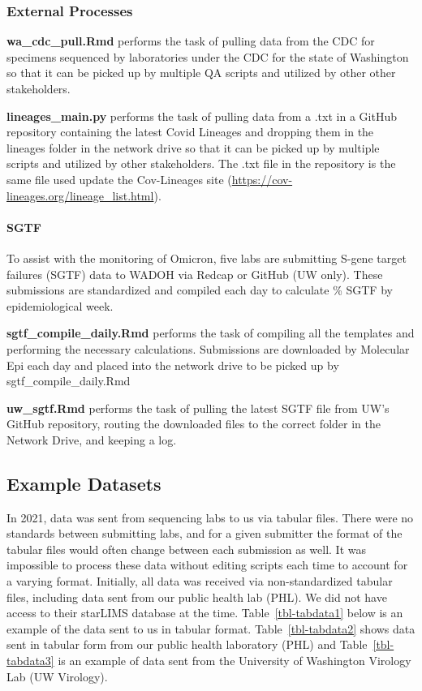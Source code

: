 \documentclass[
  letterpaper,
  DIV=11,
  numbers=noendperiod]{scrartcl}
\let\oldparagraph\paragraph
\renewcommand{\paragraph}[1]{\oldparagraph{#1}\mbox{}}
\begin{document}
\subsubsection{External Processes}\label{external-processes}

\textbf{wa\_cdc\_pull.Rmd} performs the task of pulling data from the
CDC for specimens sequenced by laboratories under the CDC for the state
of Washington so that it can be picked up by multiple QA scripts and
utilized by other other stakeholders.

\textbf{lineages\_main.py} performs the task of pulling data from a .txt
in a GitHub repository containing the latest Covid Lineages and dropping
them in the lineages folder in the network drive so that it can be
picked up by multiple scripts and utilized by other stakeholders. The
.txt file in the repository is the same file used update the
Cov-Lineages site (\url{https://cov-lineages.org/lineage_list.html}).

\paragraph{SGTF}\label{sgtf}

To assist with the monitoring of Omicron, five labs are submitting
S-gene target failures (SGTF) data to WADOH via Redcap or GitHub (UW
only). These submissions are standardized and compiled each day to
calculate \% SGTF by epidemiological week.

\textbf{sgtf\_compile\_daily.Rmd} performs the task of compiling all the
templates and performing the necessary calculations. Submissions are
downloaded by Molecular Epi each day and placed into the network drive
to be picked up by sgtf\_compile\_daily.Rmd

\textbf{uw\_sgtf.Rmd} performs the task of pulling the latest SGTF file
from UW's GitHub repository, routing the downloaded files to the correct
folder in the Network Drive, and keeping a log.

\subsection{Example Datasets}\label{example-datasets}

In 2021, data was sent from sequencing labs to us via tabular files.
There were no standards between submitting labs, and for a given
submitter the format of the tabular files would often change between
each submission as well\hspace{0pt}. It was impossible to process these
data without editing scripts each time to account for a varying format.
Initially, all data was received via non-standardized tabular files,
including data sent from our public health lab (PHL). We did not have
access to their starLIMS database at the time. Table~\ref{tbl-tabdata1}
below is an example of the data sent to us in tabular format.
Table~\ref{tbl-tabdata2} shows data sent in tabular form from our public
health laboratory (PHL) and Table~\ref{tbl-tabdata3} is an example of
data sent from the University of Washington Virology Lab (UW Virology).
\end{document}
